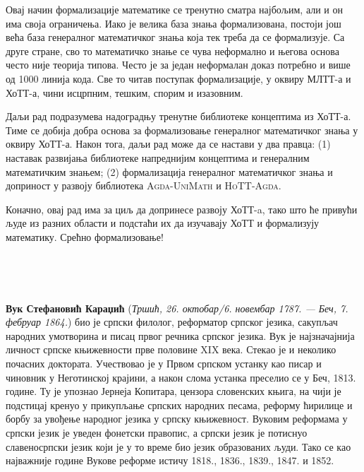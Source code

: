 \documentclass[12pt,oneside]{memoir}
\begin{document}
Овај начин формализације математике се тренутно сматра најбољим, али и он има своја ограничења. Иако је велика база знања формализована, постоји још већа база генералног математичког знања која тек треба да се формализује. Са друге стране, сво то математичко знање се чува неформално и његова основа често није теорија типова. Често је за један неформалан доказ потребно и више од 1000 линија кода. Све то читав поступак формализације, у оквиру МЛТТ-а и ХоТТ-а, чини исцрпним, тешким, спорим и изазовним.

Даљи рад подразумева надоградњу тренутне библиотеке концептима из ХоТТ-а. Тиме се добија добра основа за формализовање генералног математичког знања у оквиру ХоТТ-а. Након тога, даљи рад може да се настави у два правца: (1) наставак развијања библиотеке напреднијим концептима и генералним математичким знањем; (2) формализација генералног математичког знања и доприност у развоју библиотека \textsc{Agda-UniMath} и \textsc{HoTT-Agda}.

Коначно, овај рад има за циљ да допринесе развоју ХоТТ-a, тако што ће привући људе из разних области и подстаћи их да изучавају ХоТТ и формализују математику. Срећно формализовање! 

\nocite{*}
\literatura\

\backmatter\

\begin{biografija}
\textbf{Вук Стефановић Караџић} (\emph{Тршић, 26. октобар/6. новембар
  1787. — Беч, 7. фебруар 1864.}) био је српски филолог, реформатор
српског језика, сакупљач народних умотворина и писац првог речника
српског језика.  Вук је најзначајнија личност српске књижевности прве
половине XIX века. Стекао је и неколико почасних доктората.
Учествовао је у Првом српском устанку као писар и чиновник у
Неготинској крајини, а након слома устанка преселио се у Беч,
1813. године. Ту је упознао Јернеја Копитара, цензора словенских
књига, на чији је подстицај кренуо у прикупљање српских народних
песама, реформу ћирилице и борбу за увођење народног језика у српску
књижевност. Вуковим реформама у српски језик је уведен фонетски
правопис, а српски језик је потиснуо славеносрпски језик који је у то
време био језик образованих људи. Тако се као најважније године Вукове
реформе истичу 1818., 1836., 1839., 1847. и 1852.
\end{biografija}
\end{document}

